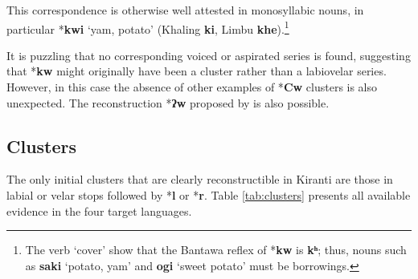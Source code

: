 \documentclass[oldfontcommands,oneside,a4paper,11pt]{article}
\newcommand{\ipa}[1]{\textbf{{\phon\mbox{#1}}}} %
\begin{document}
 This correspondence is otherwise well attested in monosyllabic nouns, in particular *\ipa{kwi} `yam, potato' (Khaling \ipa{ki}, Limbu \ipa{khe}).\footnote{The verb `cover' show that the Bantawa reflex of *\ipa{kw} is \ipa{kʰ}; thus, nouns such as \ipa{saki} `potato, yam' and \ipa{ogi} `sweet potato' must be borrowings.}

It is puzzling that no corresponding voiced or aspirated series is found, suggesting that *\ipa{kw} might originally have been a cluster rather than a labiovelar series. However, in this case the absence of other examples of *\ipa{Cw} clusters is also unexpected. The reconstruction *\ipa{ʔw} proposed by \citet{michailovsky94stops} is also possible.

\subsection{Clusters} \label{sec:clusters}
The only initial clusters that are clearly reconstructible in Kiranti are those in labial or velar stops followed by *\ipa{l} or *\ipa{r}. Table \ref{tab:clusters} presents all available evidence in the four target languages.
\end{document}
